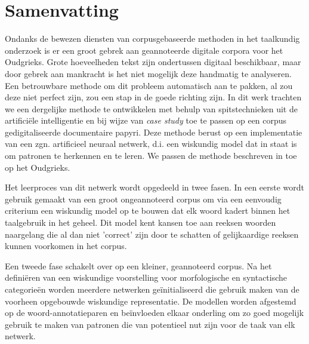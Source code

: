
\begingroup
\let\clearpage\relax
\let\cleardoublepage\relax
\let\cleardoublepage\relax



\chapter*{Samenvatting}

Ondanks de bewezen diensten van corpusgebaseerde methoden in het
taalkundig onderzoek is er een groot gebrek aan geannoteerde digitale
corpora voor het Oudgrieks. Grote hoeveelheden tekst zijn ondertussen
digitaal beschikbaar, maar door gebrek aan mankracht is het niet
mogelijk deze handmatig te analyseren. Een betrouwbare methode om dit
probleem automatisch aan te pakken, al zou deze niet perfect zijn, zou
een stap in de goede richting zijn.
In dit werk trachten we een dergelijke methode te ontwikkelen met
behulp van spitstechnieken uit de artificiële intelligentie en bij
wijze van \textit{case study} toe te passen op een corpus
gedigitaliseerde documentaire papyri. Deze methode berust op een
implementatie van een zgn. artificieel neuraal netwerk, d.i. een
wiskundig model dat in staat is om patronen te herkennen en te
leren. We passen de methode beschreven in \cite{collobert-2011} toe op
het Oudgrieks.

Het leerproces van dit netwerk wordt opgedeeld in twee fasen. In een
eerste wordt gebruik gemaakt van een groot ongeannoteerd corpus om via
een eenvoudig criterium een wiskundig model op te bouwen dat elk woord
kadert binnen het taalgebruik in het geheel.  Dit model kent kansen
toe aan reeksen woorden naargelang die al dan niet 'correct' zijn door
te schatten of gelijkaardige reeksen kunnen voorkomen in het
corpus. 

Een tweede fase schakelt over op een kleiner, geannoteerd corpus. Na
het defini\"eren van een wiskundige voorstelling voor morfologische en
syntactische categorie\"en worden meerdere netwerken ge\"initialiseerd
die gebruik maken van de voorheen opgebouwde wiskundige
representatie. De modellen worden afgestemd op de woord-annotatieparen
en be\"invloeden elkaar onderling om zo goed mogelijk gebruik te maken
van patronen die van potentieel nut zijn voor de taak van elk netwerk.

